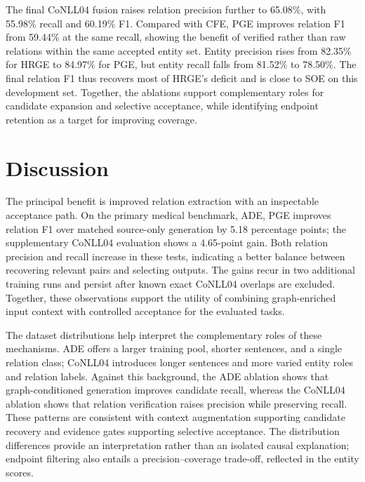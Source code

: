 \documentclass[a4paper,fleqn,numbers,doubleblind]{cas-dc}
\begin{document}
The final CoNLL04 fusion raises relation precision further to 65.08\%, with
55.98\% recall and 60.19\% F1. Compared with CFE, PGE improves relation F1
from 59.44\% at the same recall, showing the benefit of verified rather than
raw relations within the same accepted entity set. Entity precision rises
from 82.35\% for HRGE to 84.97\% for PGE, but entity recall falls from
81.52\% to 78.50\%. The final relation F1 thus recovers most of HRGE's
deficit and is close to SOE on this development set. Together, the ablations
support complementary roles for candidate expansion and selective acceptance,
while identifying endpoint retention as a target for improving coverage.

\begin{table}[t]
\centering\scriptsize\setlength{\tabcolsep}{3pt}
\caption{Development-set ablation under the common strict-span evaluator
(micro \%). These rows characterize the fixed architecture and are
not additional promoted test systems.}
\label{tab:ablation}

\end{table}

\section{Discussion}
\label{sec:discussion}
The principal benefit is improved relation extraction with an inspectable
acceptance path. On the primary medical benchmark, ADE, PGE improves relation
F1 over matched source-only generation by 5.18 percentage points; the
supplementary CoNLL04 evaluation shows a 4.65-point gain. Both relation
precision and recall increase in these tests, indicating a better balance
between recovering relevant pairs and selecting outputs. The gains recur in
two additional training runs and persist after known exact CoNLL04 overlaps
are excluded. Together, these observations support the utility of combining
graph-enriched input context with controlled acceptance for the evaluated tasks.

The dataset distributions help interpret the complementary roles of these
mechanisms. ADE offers a larger training pool, shorter sentences, and a single
relation class; CoNLL04 introduces longer sentences and more varied entity
roles and relation labels. Against this background, the ADE ablation shows
that graph-conditioned generation improves candidate recall, whereas the
CoNLL04 ablation shows that relation verification raises precision while
preserving recall. These patterns are consistent with context augmentation
supporting candidate recovery and evidence gates supporting selective
acceptance. The distribution differences provide an interpretation rather
than an isolated causal explanation; endpoint filtering also entails a
precision--coverage trade-off, reflected in the entity scores.
\end{document}
